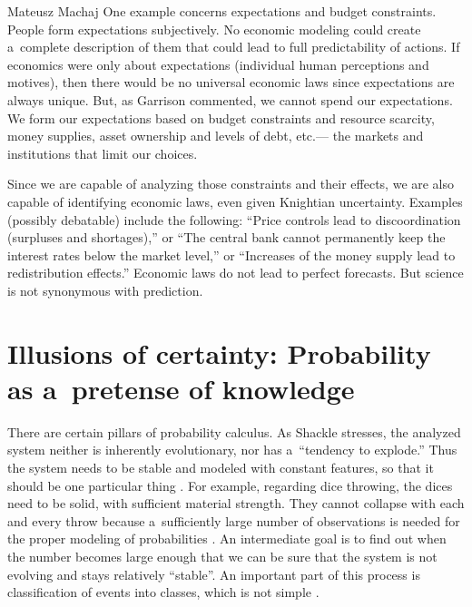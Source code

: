 \begin{artengenv}{Mateusz Machaj}
One example concerns expectations and budget constraints. People form expectations subjectively. No economic modeling could create a~complete description of them that could lead to full predictability of actions. If economics were only about expectations (individual human perceptions and motives), then there would be no universal economic laws since expectations are always unique. But, as Garrison 
\parencite*[][p.9]{garrison_time_2001} %
 commented, we cannot spend our expectations. We form our expectations based on budget constraints and resource scarcity, money supplies, asset ownership and levels of debt, etc.--- the markets and institutions that limit our choices.



Since we are capable of analyzing those constraints and their effects, we are also capable of identifying economic laws, even given Knightian uncertainty. Examples (possibly debatable) include the following: ``Price controls lead to discoordination (surpluses and shortages),'' or ``The central bank cannot permanently keep the interest rates below the market level,'' or ``Increases of the money supply lead to redistribution effects.'' Economic laws do not lead to perfect forecasts. But science is not synonymous with prediction.



\section{Illusions of certainty: Probability as a~pretense of knowledge}

There are certain pillars of probability calculus. As Shackle stresses, the analyzed system neither is inherently evolutionary, nor has a~``tendency to explode.'' Thus the system needs to be stable and modeled with constant features, so that it should be one particular thing 
\parencite[][p.381]{shackle_epistemics_1972}. %
 For example, regarding dice throwing, the dices need to be solid, with sufficient material strength. They cannot collapse with each and every throw because a~sufficiently large number of observations is needed for the proper modeling of probabilities 
\parencite[][p.91]{salmon_foundations_1967}. %
 An intermediate goal is to find out when the number becomes large enough that we can be sure that the system is not evolving and stays relatively ``stable''. An important part of this process is classification of events into classes, which is not simple 
\parencite[][pp.337–338]{swinburne_probability_1971}.%





\end{artengenv}

